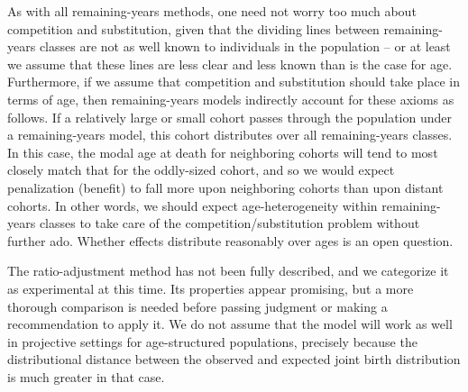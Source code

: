 As with all remaining-years methods, one need not worry too much about
competition and substitution, given that the dividing lines between
remaining-years classes are not as well known to individuals in the population
-- or at least we assume that these lines are less clear and less known than is the case
for age. Furthermore, if we assume that competition and substitution should take
place in terms of age, then remaining-years models indirectly account for
these axioms as follows. If a relatively large or small cohort passes through 
the population under a remaining-years model, this cohort distributes over
all remaining-years classes. In this case, the modal age at death for neighboring
cohorts will tend to most closely match that for the oddly-sized cohort, and so
we would expect penalization (benefit) to fall more upon neighboring cohorts
than upon distant cohorts. In other words, we should expect age-heterogeneity
within remaining-years classes to take care of the competition/substitution
problem without further ado. Whether effects distribute reasonably over ages is
an open question.

The ratio-adjustment method has not been fully described, and we categorize it
as experimental at this time. Its properties appear promising, but
a more thorough comparison is needed before passing judgment or making a
recommendation to apply it. We do not assume that the model will work as well in
projective settings for age-structured populations, precisely because the
distributional distance between the observed and expected joint birth
distribution is much greater in that case.

\FloatBarrier


